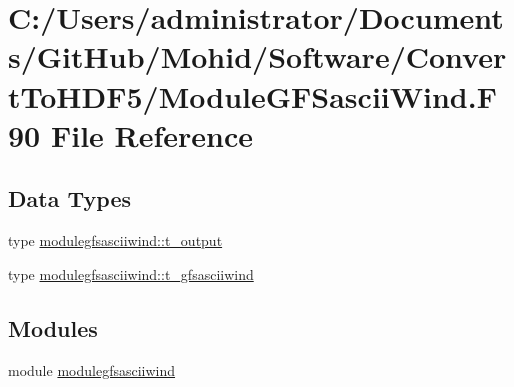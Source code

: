 \hypertarget{_module_g_f_sascii_wind_8_f90}{}\section{C\+:/\+Users/administrator/\+Documents/\+Git\+Hub/\+Mohid/\+Software/\+Convert\+To\+H\+D\+F5/\+Module\+G\+F\+Sascii\+Wind.F90 File Reference}
\label{_module_g_f_sascii_wind_8_f90}
\subsection*{Data Types}
\begin{DoxyCompactItemize}
\item 
type \mbox{\hyperlink{structmodulegfsasciiwind_1_1t__output}{modulegfsasciiwind\+::t\+\_\+output}}
\item 
type \mbox{\hyperlink{structmodulegfsasciiwind_1_1t__gfsasciiwind}{modulegfsasciiwind\+::t\+\_\+gfsasciiwind}}
\end{DoxyCompactItemize}
\subsection*{Modules}
\begin{DoxyCompactItemize}
\item 
module \mbox{\hyperlink{namespacemodulegfsasciiwind}{modulegfsasciiwind}}
\end{DoxyCompactItemize}
